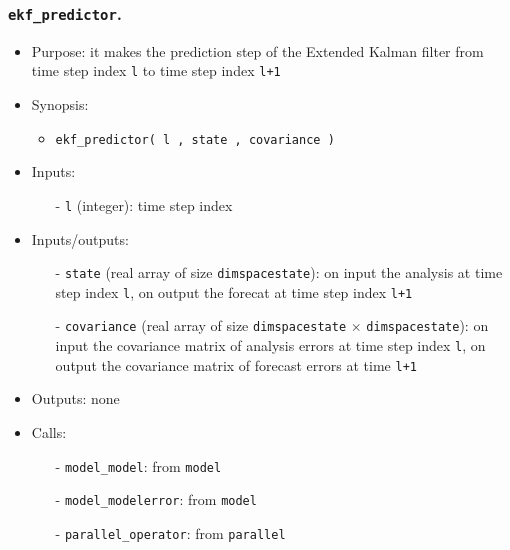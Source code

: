 \documentclass[12pt]{article}
\begin{document}
\subsubsection{{\tt ekf\_predictor}.}
\begin{itemize}
\item Purpose: it makes the prediction step of the Extended Kalman filter from time step index {\tt l} to time step index {\tt l+1}
\item Synopsis: 
\begin{itemize}
\item {\tt ekf\_predictor( l , state , covariance )}
\end{itemize}
\item Inputs: 
\begin{itemize}
\item[-] {\tt l} (integer): time step index
\end{itemize}
\item Inputs/outputs: 
\begin{itemize}
\item[-] {\tt state} (real array of size {\tt dimspacestate}): on input the analysis at time step index {\tt l}, on output the forecat at time step index {\tt l+1}
\item[-] {\tt covariance} (real array of size {\tt dimspacestate} $\times$ {\tt dimspacestate}): on input the covariance matrix of analysis errors at time step index {\tt l}, on output the covariance matrix of forecast errors at time {\tt l+1}
\end{itemize}
\item Outputs: none
\item Calls: 
\begin{itemize}
\item[-] {\tt model\_model}: from {\tt model}
\item[-] {\tt model\_modelerror}: from {\tt model}
\item[-] {\tt parallel\_operator}: from {\tt parallel}
\end{itemize}
\end{itemize} 
\end{document}
